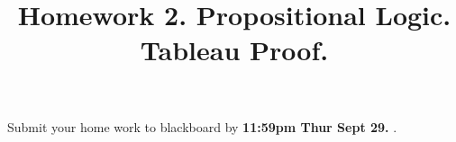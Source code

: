 \documentclass[12pt, letterpaper]{article}
\begin{document}
\newcommand{\ee}[1] {
  \begin{enumerate}
    #1
  \end{enumerate}
}
\newcommand{\ie}[1] {
  \begin{itemize}
    #1
  \end{itemize}
}

\newcommand{\hide}[1]{}
\newcommand{\set}[1]{\{#1\}}
\newtheorem{definition}{Definition}

\newcommand{\duedate}{
    11:59pm Thur Sept 29.
}


\title{{\bf Homework 2}. Propositional Logic. Tableau Proof.}
\date{}
\maketitle

\thispagestyle{myheadings} 

\noindent Submit your home work to blackboard by {\bf \duedate}. %
\end{document}
